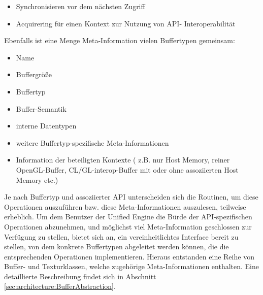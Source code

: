 \begin{description}
\begin{itemize}
		\item Synchronisieren vor dem nächsten Zugriff
		\item Acquirering für einen Kontext zur Nutzung von API- Interoperabilität	
	\end{itemize}
	Ebenfalls ist eine Menge Meta-Information vielen Buffertypen gemeinsam:
	\begin{itemize}
		\item Name
		\item Buffergröße
		\item Buffertyp
		\item Buffer-Semantik
		\item interne Datentypen
		\item weitere Buffertyp-spezifische Meta-Informationen
		\item Information der beteiligten Kontexte ( z.B. nur Host Memory, reiner OpenGL-Buffer, 
				CL/GL-interop-Buffer mit oder ohne assoziierten Host Memory etc.)
	\end{itemize}
	
	Je nach Buffertyp und assoziierter API unterscheiden sich die Routinen, um diese Operationen auszuführen bzw. diese 	
	Meta-Informationen auszulesen, 
	teilweise erheblich.
	Um dem Benutzer der Unified Engine die Bürde der API-spezifischen Operationen abzunehmen, und möglichst viel
	Meta-Information geschlossen zur Verfügung zu stellen, bietet sich an,
	ein vereinheitlichtes Interface bereit zu stellen, von dem konkrete Buffertypen abgeleitet werden können,
	die die entsprechenden Operationen implementieren.
	Hieraus entstanden eine Reihe von Buffer- und Texturklassen, welche zugehörige Meta-Informationen \linebreak enthalten.
	Eine detaillierte Beschreibung findet sich in Abschnitt \ref{sec:architecture:BufferAbstraction}.
	
	

\end{description}
